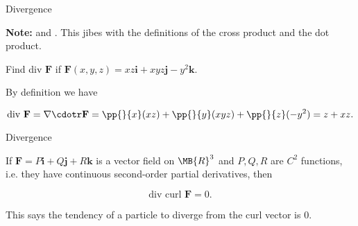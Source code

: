 \documentclass[11pt,english,
handout
]{beamer}
\begin{document}
\begin{frame}[t]{Divergence}
\small

\textbf{Note:}  and . This jibes with the definitions of the cross product and the dot product.\pause 

\lspace
\begin{center}
\pause
\end{center}



\lspace
\begin{example}
Find div $\mathbf{F}$ if $\mathbf{F}(x,y,z)=xz\mathbf{i}+xyz\mathbf{j}-y^2\mathbf{k}$.\pause 

\lspace
By definition we have

\[
\text{div }\mathbf{F}=\nabla \cdotr \mathbf{F}=\pp{}{x}(xz)+\pp{}{y}(xyz)+\pp{}{z}(-y^2)=z+xz.
\]
\end{example}
\end{frame}









\begin{frame}{Divergence}
\small
\begin{theorem}
If $\mathbf{F}=P\mathbf{i}+Q\mathbf{j}+R\mathbf{k}$ is a vector field on $\MB{R}^3$ and $P,Q,R$ are $C^2$ functions, i.e. they have continuous second-order partial derivatives, then

\[
\text{div curl }\mathbf{F}=0.
\]
\end{theorem}\pause 

\lspace
This says the tendency of a particle to diverge from the curl vector is 0.
\end{frame}
\end{document}
